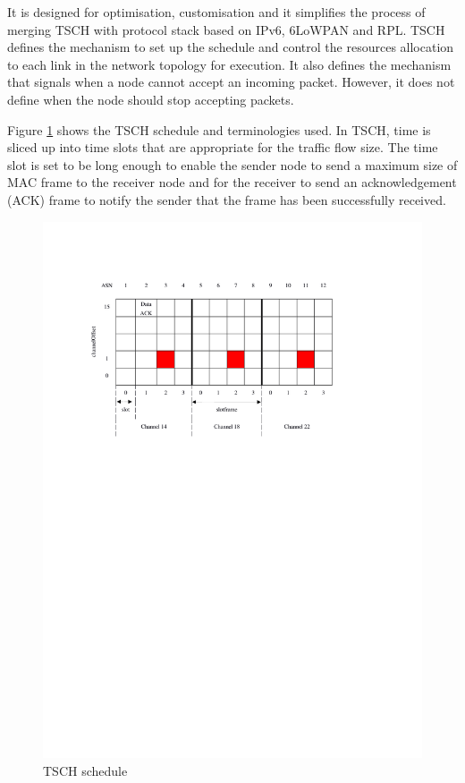 It is designed for optimisation, customisation and it simplifies the process of merging TSCH with protocol stack based on IPv6, 6LoWPAN and RPL. TSCH defines the mechanism to set up the schedule and control the resources allocation to each link in the network topology for execution. It also defines the mechanism that signals when a node cannot accept an incoming packet. However, it does not define when the node should stop accepting packets.

Figure \ref{fig_tsch} shows the TSCH schedule and terminologies used. In TSCH, time is sliced up into time slots that are appropriate for the traffic flow size. The time slot is set to be long enough to enable the sender node to send a maximum size of MAC frame to the receiver node and for the receiver to send an acknowledgement (ACK) frame to notify the sender that the frame has been successfully received.

\begin{figure}
\centering
\includegraphics[trim=2cm 17cm 4cm 3cm, clip=true, totalheight=0.40\textheight]{tsch.pdf}
\caption{TSCH schedule}
\label{fig_tsch}
\end{figure}

